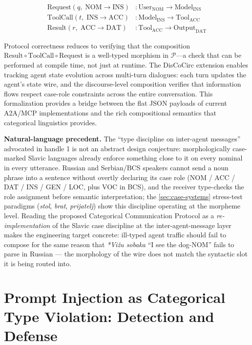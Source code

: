 \documentclass[
]{article}
\begin{document}
\begin{align}
\text{Request}(q,\; \text{NOM} \to \text{INS}) &: \text{User}_{\text{NOM}} \to \text{Model}_{\text{INS}} \label{eq:protocol-request} \\
\text{ToolCall}(t,\; \text{INS} \to \text{ACC}) &: \text{Model}_{\text{INS}} \to \text{Tool}_{\text{ACC}} \label{eq:protocol-toolcall} \\
\text{Result}(r,\; \text{ACC} \to \text{DAT}) &: \text{Tool}_{\text{ACC}} \to \text{Output}_{\text{DAT}} \label{eq:protocol-result}
\end{align}

Protocol correctness reduces to verifying that the composition
\(\text{Result} \circ \text{ToolCall} \circ \text{Request}\) is a
well-typed morphism in \(\mathcal{P}\)---a check that can be performed
at compile time, not just at runtime. The DisCoCirc extension enables
tracking agent state evolution across multi-turn dialogues: each turn
updates the agent's state wire, and the discourse-level composition
verifies that information flows respect case-role constraints across the
entire conversation. This formalization provides a bridge between the
flat JSON payloads of current A2A/MCP implementations and the rich
compositional semantics that categorical linguistics provides.

\textbf{Natural-language precedent.} The ``type discipline on
inter-agent messages'' advocated in handle 1 is not an abstract design
conjecture: morphologically case-marked Slavic languages already enforce
something close to it on every nominal in every utterance. Russian and
Serbian/BCS speakers cannot send a noun phrase into a sentence without
overtly declaring its case role (NOM / ACC / DAT / INS / GEN / LOC, plus
VOC in BCS), and the receiver type-checks the role assignment before
semantic interpretation; the \autoref{sec:case-systems} stress-test
paradigms (\emph{stol}, \emph{brat}, \emph{prijatelj}) show this
discipline operating at the morpheme level. Reading the proposed
Categorical Communication Protocol as a \emph{re-implementation} of the
Slavic case discipline at the inter-agent-message layer makes the
engineering target concrete: ill-typed agent traffic should fail to
compose for the same reason that \emph{*Vižu sobaka} ``I see the
dog-NOM'' fails to parse in Russian --- the morphology of the wire does
not match the syntactic slot it is being routed into.

\newpage

\section{Prompt Injection as Categorical Type Violation: Detection and
Defense}\label{sec:cognitive-security}
\end{document}
